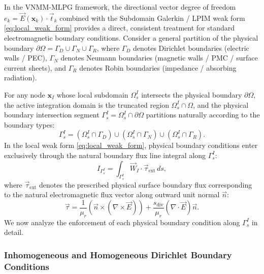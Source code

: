 \documentclass[preprint,12pt]{elsarticle}
\begin{document}
In the VNMM-MLPG framework, the directional vector degree of freedom $e_k = \vec{E}(\mathbf{x}_k) \cdot \vec{t}_k$ combined with the Subdomain Galerkin / LPIM weak form \eqref{eq:local_weak_form} provides a direct, consistent treatment for standard electromagnetic boundary conditions. Consider a general partition of the physical boundary $\partial\Omega = \Gamma_D \cup \Gamma_N \cup \Gamma_R$, where $\Gamma_D$ denotes Dirichlet boundaries (electric walls / PEC), $\Gamma_N$ denotes Neumann boundaries (magnetic walls / PMC / surface current sheets), and $\Gamma_R$ denotes Robin boundaries (impedance / absorbing radiation).

For any node $\mathbf{x}_I$ whose local subdomain $\Omega_s^I$ intersects the physical boundary $\partial\Omega$, the active integration domain is the truncated region $\Omega_s^I \cap \Omega$, and the physical boundary intersection segment $\Gamma_s^I = \Omega_s^I \cap \partial\Omega$ partitions naturally according to the boundary types:
\begin{equation}
    \Gamma_s^I = (\Omega_s^I \cap \Gamma_D) \cup (\Omega_s^I \cap \Gamma_N) \cup (\Omega_s^I \cap \Gamma_R).
\end{equation}
In the local weak form \eqref{eq:local_weak_form}, physical boundary conditions enter exclusively through the natural boundary flux line integral along $\Gamma_s^I$:
\begin{equation}
    I_{\Gamma_s^I} = \int_{\Gamma_s^I} \vec{W}_I \cdot \vec{\tau}_{\mathrm{ext}} \, ds,
    \label{eq:boundary_flux_partition}
\end{equation}
where $\vec{\tau}_{\mathrm{ext}}$ denotes the prescribed physical surface boundary flux corresponding to the natural electromagnetic flux vector along outward unit normal $\vec{n}$:
\begin{equation}
    \vec{\tau} = \frac{1}{\mu_r} \left( \vec{n} \times (\nabla \times \vec{E}) \right) + \frac{s_{\mathrm{div}}}{\mu_r} (\nabla \cdot \vec{E}) \vec{n}.
    \label{eq:traction_vector}
\end{equation}
We now analyze the enforcement of each physical boundary condition along $\Gamma_s^I$ in detail.

\subsubsection{Inhomogeneous and Homogeneous Dirichlet Boundary Conditions}
\label{subsubsec:dirichlet_bc}
\end{document}
